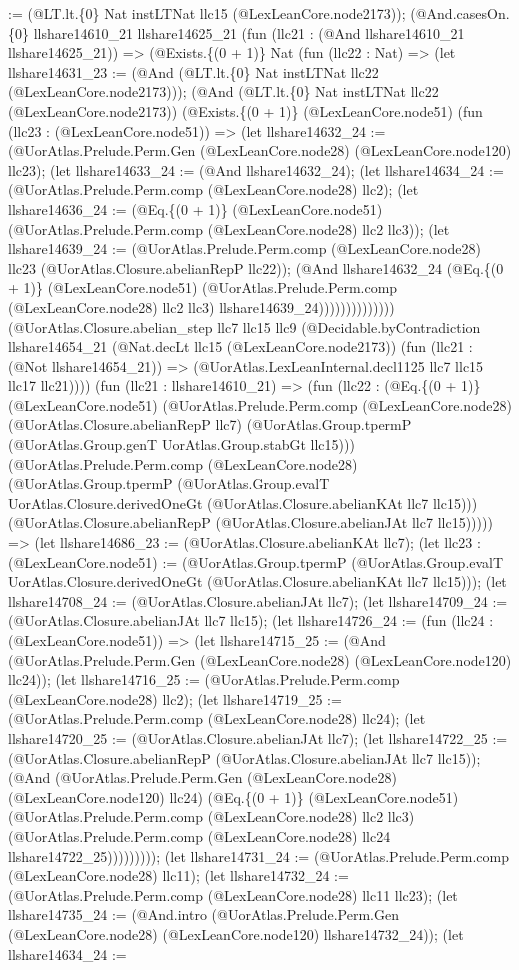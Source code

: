 \documentclass[11pt]{article}
\begin{document}
:= (@LT.lt.\{0\} Nat instLTNat llc15 (@LexLeanCore.node2173)); (@And.casesOn.\{0\} llshare14610\_21 llshare14625\_21 (fun (llc21 : (@And llshare14610\_21 llshare14625\_21)) => (@Exists.\{(0 + 1)\} Nat (fun (llc22 : Nat) => (let llshare14631\_23 := (@And (@LT.lt.\{0\} Nat instLTNat llc22 (@LexLeanCore.node2173))); (@And (@LT.lt.\{0\} Nat instLTNat llc22 (@LexLeanCore.node2173)) (@Exists.\{(0 + 1)\} (@LexLeanCore.node51) (fun (llc23 : (@LexLeanCore.node51)) => (let llshare14632\_24 := (@UorAtlas.Prelude.Perm.Gen (@LexLeanCore.node28) (@LexLeanCore.node120) llc23); (let llshare14633\_24 := (@And llshare14632\_24); (let llshare14634\_24 := (@UorAtlas.Prelude.Perm.comp (@LexLeanCore.node28) llc2); (let llshare14636\_24 := (@Eq.\{(0 + 1)\} (@LexLeanCore.node51) (@UorAtlas.Prelude.Perm.comp (@LexLeanCore.node28) llc2 llc3)); (let llshare14639\_24 := (@UorAtlas.Prelude.Perm.comp (@LexLeanCore.node28) llc23 (@UorAtlas.Closure.abelianRepP llc22)); (@And llshare14632\_24 (@Eq.\{(0 + 1)\} (@LexLeanCore.node51) (@UorAtlas.Prelude.Perm.comp (@LexLeanCore.node28) llc2 llc3) llshare14639\_24)))))))))))))) (@UorAtlas.Closure.abelian\_step llc7 llc15 llc9 (@Decidable.byContradiction llshare14654\_21 (@Nat.decLt llc15 (@LexLeanCore.node2173)) (fun (llc21 : (@Not llshare14654\_21)) => (@UorAtlas.LexLeanInternal.decl1125 llc7 llc15 llc17 llc21)))) (fun (llc21 : llshare14610\_21) => (fun (llc22 : (@Eq.\{(0 + 1)\} (@LexLeanCore.node51) (@UorAtlas.Prelude.Perm.comp (@LexLeanCore.node28) (@UorAtlas.Closure.abelianRepP llc7) (@UorAtlas.Group.tpermP (@UorAtlas.Group.genT UorAtlas.Group.stabGt llc15))) (@UorAtlas.Prelude.Perm.comp (@LexLeanCore.node28) (@UorAtlas.Group.tpermP (@UorAtlas.Group.evalT UorAtlas.Closure.derivedOneGt (@UorAtlas.Closure.abelianKAt llc7 llc15))) (@UorAtlas.Closure.abelianRepP (@UorAtlas.Closure.abelianJAt llc7 llc15))))) => (let llshare14686\_23 := (@UorAtlas.Closure.abelianKAt llc7); (let llc23 : (@LexLeanCore.node51) := (@UorAtlas.Group.tpermP (@UorAtlas.Group.evalT UorAtlas.Closure.derivedOneGt (@UorAtlas.Closure.abelianKAt llc7 llc15))); (let llshare14708\_24 := (@UorAtlas.Closure.abelianJAt llc7); (let llshare14709\_24 := (@UorAtlas.Closure.abelianJAt llc7 llc15); (let llshare14726\_24 := (fun (llc24 : (@LexLeanCore.node51)) => (let llshare14715\_25 := (@And (@UorAtlas.Prelude.Perm.Gen (@LexLeanCore.node28) (@LexLeanCore.node120) llc24)); (let llshare14716\_25 := (@UorAtlas.Prelude.Perm.comp (@LexLeanCore.node28) llc2); (let llshare14719\_25 := (@UorAtlas.Prelude.Perm.comp (@LexLeanCore.node28) llc24); (let llshare14720\_25 := (@UorAtlas.Closure.abelianJAt llc7); (let llshare14722\_25 := (@UorAtlas.Closure.abelianRepP (@UorAtlas.Closure.abelianJAt llc7 llc15)); (@And (@UorAtlas.Prelude.Perm.Gen (@LexLeanCore.node28) (@LexLeanCore.node120) llc24) (@Eq.\{(0 + 1)\} (@LexLeanCore.node51) (@UorAtlas.Prelude.Perm.comp (@LexLeanCore.node28) llc2 llc3) (@UorAtlas.Prelude.Perm.comp (@LexLeanCore.node28) llc24 llshare14722\_25))))))))); (let llshare14731\_24 := (@UorAtlas.Prelude.Perm.comp (@LexLeanCore.node28) llc11); (let llshare14732\_24 := (@UorAtlas.Prelude.Perm.comp (@LexLeanCore.node28) llc11 llc23); (let llshare14735\_24 := (@And.intro (@UorAtlas.Prelude.Perm.Gen (@LexLeanCore.node28) (@LexLeanCore.node120) llshare14732\_24)); (let llshare14634\_24 := 
\end{document}

